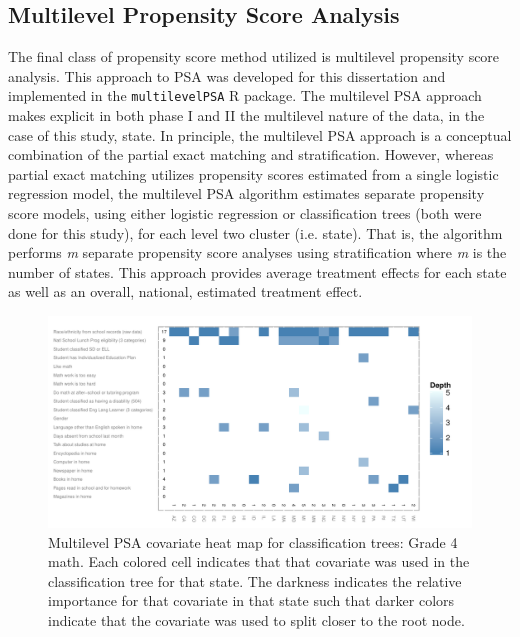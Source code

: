 \documentclass[letterpaper,12pt]{article} %
\begin{document}
\subsection{Multilevel Propensity Score Analysis}

The final class of propensity score method utilized is multilevel propensity score analysis. This approach to PSA was developed for this dissertation and implemented in the \texttt{multilevelPSA} R package. The multilevel PSA approach makes explicit in both phase I and II the multilevel nature of the data, in the case of this study, state. In principle, the multilevel PSA approach is a conceptual combination of the partial exact matching and stratification. However, whereas partial exact matching utilizes propensity scores estimated from a single logistic regression model, the multilevel PSA algorithm estimates separate propensity score models, using either logistic regression or classification trees (both were done for this study), for each level two cluster (i.e. state). That is, the algorithm performs \textit{m} separate propensity score analyses using stratification where \textit{m} is the number of states. This approach provides average treatment effects for each state as well as an overall, national, estimated treatment effect.

\setlength{\belowcaptionskip}{-10pt}
\begin{figure}[t]
\begin{center}
\includegraphics[width=\textwidth]{../Figures2009/g4math-mlpsa-ctree-heat.pdf}
\caption[Multilevel PSA covariate heat map for classification trees: Grade 4 math]{Multilevel PSA covariate heat map for classification trees: Grade 4 math. Each colored cell indicates that that covariate was used in the classification tree for that state. The darkness indicates the relative importance for that covariate in that state such that darker colors indicate that the covariate was used to split closer to the root node.}
\label{fig:g4math-mlpsa-ctree-heat}
\end{center}
\end{figure}
\setlength{\belowcaptionskip}{0pt}
\end{document}
